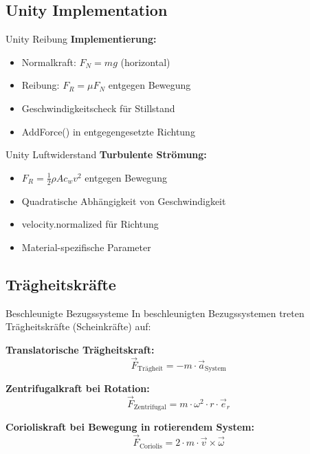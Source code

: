\subsection{Unity Implementation}

\begin{concept}{Unity Reibung}
    \textbf{Implementierung:}
    \begin{itemize}
        \item Normalkraft: $F_N = mg$ (horizontal)
        \item Reibung: $F_R = \mu F_N$ entgegen Bewegung
        \item Geschwindigkeitscheck für Stillstand
        \item AddForce() in entgegengesetzte Richtung
    \end{itemize}
\end{concept}

\begin{concept}{Unity Luftwiderstand}
    \textbf{Turbulente Strömung:}
    \begin{itemize}
        \item $F_R = \frac{1}{2}\rho A c_w v^2$ entgegen Bewegung
        \item Quadratische Abhängigkeit von Geschwindigkeit
        \item velocity.normalized für Richtung
        \item Material-spezifische Parameter
    \end{itemize}
\end{concept}

\subsection{Trägheitskräfte}

\begin{concept}{Beschleunigte Bezugssysteme}
    In beschleunigten Bezugssystemen treten Trägheitskräfte (Scheinkräfte) auf:
    
    \textbf{Translatorische Trägheitskraft:}
    \begin{equation}
        \vec{F}_{\text{Trägheit}} = -m \cdot \vec{a}_{\text{System}}
    \end{equation}
    
    \textbf{Zentrifugalkraft bei Rotation:}
    \begin{equation}
        \vec{F}_{\text{Zentrifugal}} = m \cdot \omega^2 \cdot r \cdot \vec{e}_r
    \end{equation}
    
    \textbf{Corioliskraft bei Bewegung in rotierendem System:}
    \begin{equation}
        \vec{F}_{\text{Coriolis}} = 2 \cdot m \cdot \vec{v} \times \vec{\omega}
    \end{equation}
\end{concept}

